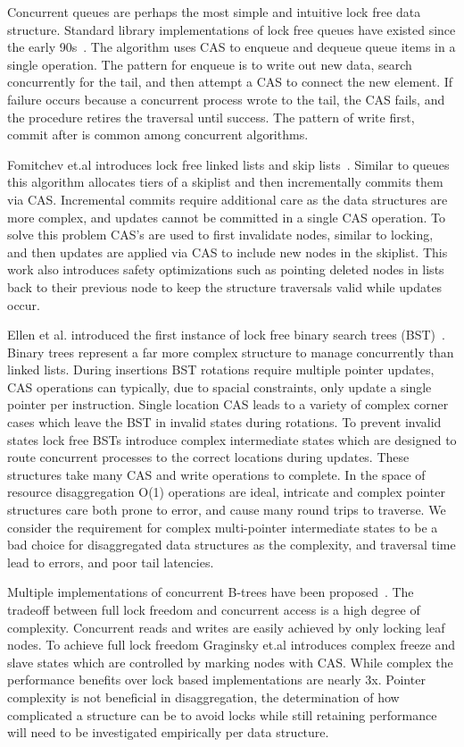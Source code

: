 Concurrent queues are perhaps the most simple and intuitive lock free data
structure. Standard library implementations of lock free queues have existed
since the early 90s~\cite{simple-fast}. The algorithm uses CAS to enqueue and
dequeue queue items in a single operation. The pattern for enqueue is to write
out new data, search concurrently for the tail, and then attempt a CAS to
connect the new element. If failure occurs because a concurrent process wrote to
the tail, the CAS fails, and the procedure retires the traversal until success.
The pattern of write first, commit after is common among concurrent algorithms.

Fomitchev et.al introduces lock free linked lists and skip
lists~\cite{lock-free-skip}. Similar to queues this algorithm allocates tiers of
a skiplist and then incrementally commits them via CAS. Incremental commits
require additional care as the data structures are more complex, and updates
cannot be committed in a single CAS operation. To solve this problem CAS's are
used to first invalidate nodes, similar to locking, and then updates are applied
via CAS to include new nodes in the skiplist. This work also introduces safety
optimizations such as pointing deleted nodes in lists back to their previous
node to keep the structure traversals valid while updates occur.

Ellen et al. introduced the first instance of lock free binary search trees
(BST)~\cite{non-block-binary}.  Binary trees represent a far more complex
structure to manage concurrently than linked lists. During insertions BST
rotations require multiple pointer updates, CAS operations can typically, due to
spacial constraints, only update a single pointer per instruction. Single
location CAS leads to a variety of complex corner cases which leave the BST in
invalid states during rotations.  To prevent invalid states lock free BSTs
introduce complex intermediate states which are designed to route concurrent
processes to the correct locations during updates. These structures take many
CAS and write operations to complete. In the space of resource disaggregation
O(1) operations are ideal, intricate and complex pointer structures care both
prone to error, and cause many round trips to traverse. We consider the
requirement for complex multi-pointer intermediate states to be a bad choice for
disaggregated data structures as the complexity, and traversal time lead to
errors, and poor tail latencies.
 
Multiple implementations of concurrent B-trees have been
proposed~\cite{read-concur-btree,lock-free-btree}. The tradeoff between full
lock freedom and concurrent access is a high degree of complexity. Concurrent
reads and writes are easily achieved by only locking leaf nodes. To achieve full
lock freedom Graginsky et.al introduces complex freeze and slave states which
are controlled by marking nodes with CAS. While complex the performance benefits
over lock based implementations are nearly 3x. Pointer complexity is not
beneficial in disaggregation, the determination of how complicated a structure
can be to avoid locks while still retaining performance will need to be
investigated empirically per data structure.

